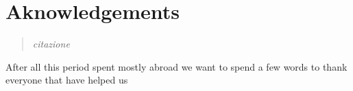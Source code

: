 \chapter*{Aknowledgements}

\begin{quote}
\textit{citazione}
\end{quote}

After all this period spent mostly abroad we want to spend a few words to thank everyone that have helped us 
